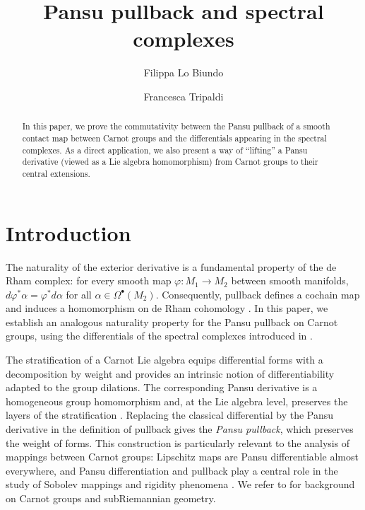 \documentclass[dvipsnames]{amsart}
\title[Pansu pullback and spectral complexes]{Pansu pullback and spectral complexes}
\author[F.~Lo Biundo]{Filippa Lo Biundo}
\author[F.~Tripaldi]{Francesca Tripaldi}
\date{}
\theoremstyle{definition}
\theoremstyle{definition}
\numberwithin{equation}{section}
\begin{document}
\maketitle
\begin{abstract}
  In this paper, we prove the commutativity between the Pansu pullback of a smooth contact map between Carnot groups and the differentials appearing in the spectral complexes. As a direct application, we also present a way of ``lifting'' a Pansu derivative (viewed as a Lie algebra homomorphism) from  Carnot groups to their central extensions. 
\end{abstract}
\section{Introduction}
The naturality of the exterior derivative is a fundamental property of the de Rham complex: for every smooth map $\varphi:M_1\to M_2$ between smooth manifolds, $d\varphi^*\alpha=\varphi^*d\alpha$ for all $\alpha\in\Omega^\bullet(M_2)$.
Consequently, pullback defines a cochain map and induces a homomorphism on de Rham cohomology \cite{bott-tu}. In this paper, we establish an analogous naturality property for the Pansu pullback on Carnot groups, using the differentials of the spectral complexes introduced in \cite{tripaldi2026spectralcomplexestruncatedmulticomplexes}.

The stratification of a Carnot Lie algebra equips differential forms with a decomposition by weight and provides an intrinsic notion of differentiability adapted to the group dilations. The corresponding Pansu derivative is a homogeneous group homomorphism and, at the Lie algebra level, preserves the layers of the stratification \cite{Pansu-quasiconformal}. Replacing the classical differential by the Pansu derivative in the definition of pullback gives the \emph{Pansu pullback}, which preserves the weight of forms. This construction is particularly relevant to the analysis of mappings between Carnot groups: Lipschitz maps are Pansu differentiable almost everywhere, and Pansu differentiation and pullback play a central role in the study of Sobolev mappings and rigidity phenomena \cite{Pansu-quasiconformal,kleiner2020pansu,kleiner2021sobolev}. We refer to \cite{LeDonne+2017+116+137,ABB,donne2024metric} for background on Carnot groups and subRiemannian geometry.
\end{document}
